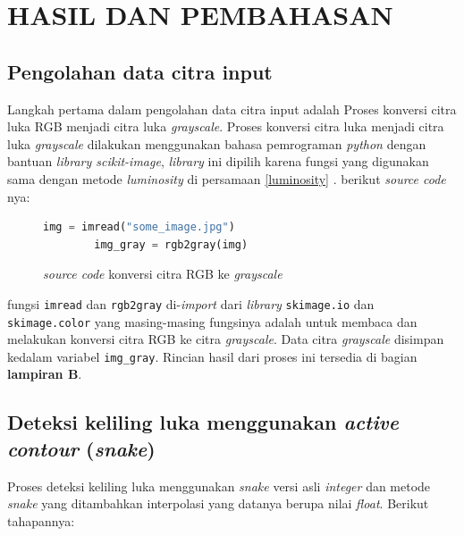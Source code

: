 
\chapter{HASIL DAN PEMBAHASAN}

\section{Pengolahan data citra input}
Langkah pertama dalam pengolahan data citra input adalah Proses konversi citra luka RGB menjadi citra luka \emph{grayscale}. Proses konversi citra luka menjadi citra luka \emph{grayscale} dilakukan menggunakan bahasa pemrograman \emph{python} dengan bantuan \emph{library scikit-image}, \emph{library} ini dipilih karena fungsi yang digunakan sama dengan metode \emph{luminosity} di persamaan \ref{luminosity} \citep{rgb2gray}. berikut \emph{source code} nya:
\begin{figure}[H]
	\begin{lstlisting}[language=Python, basicstyle=\tiny]
		img = imread("some_image.jpg")
		img_gray = rgb2gray(img)
	\end{lstlisting}
	\caption{\emph{source code} konversi citra RGB ke \emph{grayscale}}
	\label{Gambar:snap_grayscale}
\end{figure}
fungsi \texttt{imread} dan \texttt{rgb2gray} di-\emph{import} dari \emph{library} \texttt{skimage.io} dan \texttt{skimage.color} yang masing-masing fungsinya adalah untuk membaca dan melakukan konversi citra RGB ke citra \emph{grayscale}. Data citra \emph{grayscale} disimpan kedalam variabel \texttt{img\_gray}. Rincian hasil dari proses ini tersedia di bagian \textbf{lampiran B}.


\section{Deteksi keliling luka menggunakan \emph{active contour} (\emph{snake})}
Proses deteksi keliling luka menggunakan \emph{snake} versi asli \emph{integer} dan metode \emph{snake} yang ditambahkan interpolasi yang datanya berupa nilai \emph{float}. Berikut tahapannya:

